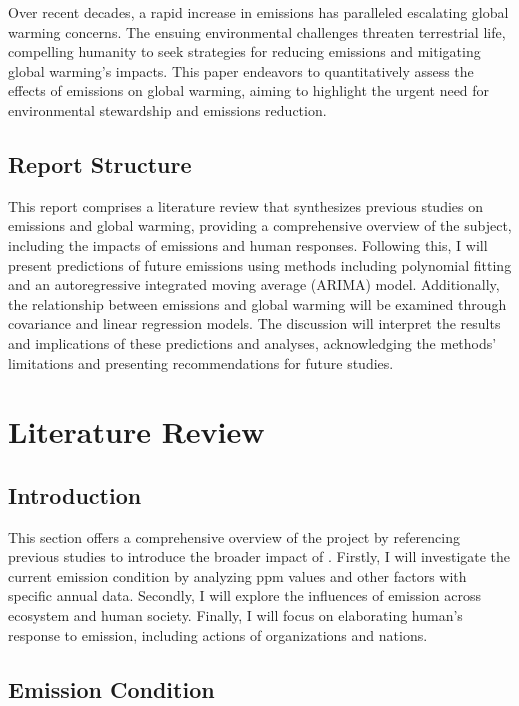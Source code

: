 \documentclass[12pt,a4paper]{article}
\begin{document}
    Over recent decades, a rapid increase in  emissions has paralleled escalating global warming concerns. The ensuing environmental challenges threaten terrestrial life, compelling humanity to seek strategies for reducing  emissions and mitigating global warming's impacts. This paper endeavors to quantitatively assess the effects of  emissions on global warming, aiming to highlight the urgent need for environmental stewardship and emissions reduction.

    \subsection{Report Structure}
    This report comprises a literature review that synthesizes previous studies on  emissions and global warming, providing a comprehensive overview of the subject, including the impacts of emissions and human responses. Following this, I will present predictions of future  emissions using methods including polynomial fitting and an autoregressive integrated moving average (ARIMA) model. Additionally, the relationship between  emissions and global warming will be examined through covariance and linear regression models. The discussion will interpret the results and implications of these predictions and analyses, acknowledging the methods' limitations and presenting recommendations for future studies.
        
    \section{Literature Review}
    \subsection{Introduction}
    This section offers a comprehensive overview of the project by referencing previous studies to introduce the broader impact of . Firstly, I will investigate the current  emission condition by analyzing ppm values and other factors with specific annual data. Secondly, I will explore the influences of  emission across ecosystem and human society. Finally, I will focus on elaborating human's response to  emission, including actions of organizations and nations.
    
    \subsection{Emission Condition}
    
\end{document}

